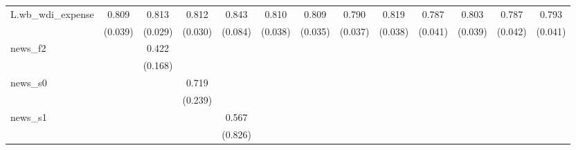 {\begin{tabular}{l*{12}{c}}
\addlinespace
L.wb\_wdi\_expense&       0.809\sym{***}&       0.813\sym{***}&       0.812\sym{***}&       0.843\sym{***}&       0.810\sym{***}&       0.809\sym{***}&       0.790\sym{***}&       0.819\sym{***}&       0.787\sym{***}&       0.803\sym{***}&       0.787\sym{***}&       0.793\sym{***}\\
            &     (0.039)         &     (0.029)         &     (0.030)         &     (0.084)         &     (0.038)         &     (0.035)         &     (0.037)         &     (0.038)         &     (0.041)         &     (0.039)         &     (0.042)         &     (0.041)         \\
\addlinespace
news\_f2     &                     &       0.422\sym{**} &                     &                     &                     &                     &                     &                     &                     &                     &                     &                     \\
            &                     &     (0.168)         &                     &                     &                     &                     &                     &                     &                     &                     &                     &                     \\
\addlinespace
news\_s0     &                     &                     &       0.719\sym{***}&                     &                     &                     &                     &                     &                     &                     &                     &                     \\
            &                     &                     &     (0.239)         &                     &                     &                     &                     &                     &                     &                     &                     &                     \\
\addlinespace
news\_s1     &                     &                     &                     &       0.567         &                     &                     &                     &                     &                     &                     &                     &                     \\
            &                     &                     &                     &     (0.826)         &                     &                     &                     &                     &                     &                     &                     &                     \\

\end{tabular}}

